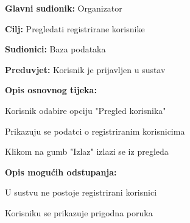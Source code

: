 					\noindent {}
					\begin{packed_item}
					
						\item \textbf{Glavni sudionik: } Organizator
						\item  \textbf{Cilj:} Pregledati registrirane korisnike
						\item  \textbf{Sudionici:} Baza podataka
						\item  \textbf{Preduvjet:} Korisnik je prijavljen u sustav
						\item  \textbf{Opis osnovnog tijeka:}
						
						\item[] \begin{packed_enum}
							
							\item Korisnik odabire opciju "Pregled korisnika"
							\item Prikazuju se podatci o registriranim korisnicima
							\item Klikom na gumb "Izlaz" izlazi se iz pregleda
						\end{packed_enum}
						
						\item  \textbf{Opis mogućih odstupanja:}
						
						\item[] \begin{packed_item}
							
							\item[2.a] U sustvu ne postoje registrirani korisnici
							\item[] \begin{packed_enum}
								
								\item Korisniku se prikazuje prigodna poruka
								
							\end{packed_enum}
				
						\end{packed_item}
					\end{packed_item}
				
